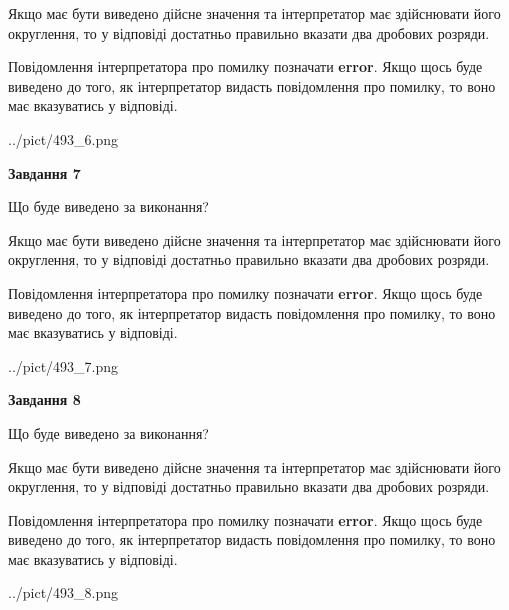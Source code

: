\documentclass[12pt, ukrainian]{article}
\begin{document}
{\begin {Large}
Якщо має бути виведено дійсне значення та інтерпретатор має здійснювати його округлення, 
то у відповіді достатньо правильно вказати два дробових розряди.

Повідомлення інтерпретатора про помилку позначати \textbf{error}.
Якщо щось буде виведено до того, як інтерпретатор видасть повідомлення про помилку, 
то воно має вказуватись у відповіді. \par

\begin{center}
	{../pict/493_6.png}
\end{center}
\newpage

{\begin {center}\textbf{Завдання 7}\end {center}}\par
Що буде виведено за виконання? \par

Якщо має бути виведено дійсне значення та інтерпретатор має здійснювати його округлення, 
то у відповіді достатньо правильно вказати два дробових розряди.

Повідомлення інтерпретатора про помилку позначати \textbf{error}.
Якщо щось буде виведено до того, як інтерпретатор видасть повідомлення про помилку, 
то воно має вказуватись у відповіді. \par

\begin{center}
	{../pict/493_7.png}
\end{center}
\newpage

{\begin {center}\textbf{Завдання 8}\end {center}}\par
Що буде виведено за виконання? \par

Якщо має бути виведено дійсне значення та інтерпретатор має здійснювати його округлення, 
то у відповіді достатньо правильно вказати два дробових розряди.

Повідомлення інтерпретатора про помилку позначати \textbf{error}.
Якщо щось буде виведено до того, як інтерпретатор видасть повідомлення про помилку, 
то воно має вказуватись у відповіді. \par

\begin{center}
	{../pict/493_8.png}
\end{center}
\newpage


\end{Large}}
\end{document}
